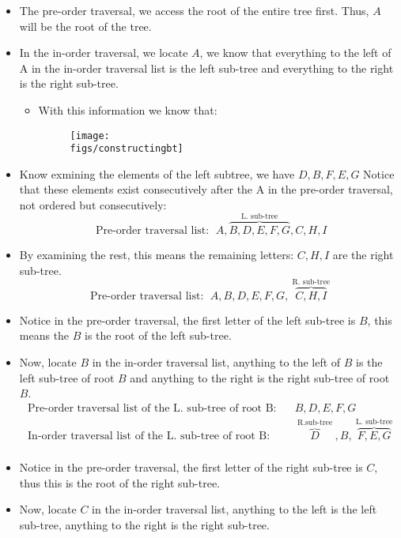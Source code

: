 \begin{itemize}
    \item The pre-order traversal, we access the root of the entire tree first. Thus, $A$ will be the root of the tree.
    \item In the in-order traversal, we locate $A$, we know that everything to the left of A in the in-order traversal list is the left sub-tree and everything to the right is the right sub-tree.
        \begin{itemize}
            \item With this information we know that: 
            \begin{figure}[H]
                \centering
                \texttt{[image: \\figs/constructingbt]}
            \end{figure}
        \end{itemize}

    \item Know exmining the elements of the left subtree, we have $D,B,F,E,G$ Notice that these elements exist consecutively after the A in the pre-order traversal, not ordered but consecutively:
        \[
            \text{ Pre-order traversal list: }\; A,\overbrace{B,D,E,F,G}^{\text{ L. sub-tree }},C,H,I 
        \]
    
    \item By examining the rest, this means the remaining letters: $C,H,I$ are the right sub-tree.
        \[
            \text{ Pre-order traversal list: }\; A,B,D,E,F,G,\overbrace{C,H,I}^{\text{ R. sub-tree }} 
        \]
    
    \item Notice in the pre-order traversal, the first letter of the left sub-tree is $B$, this means the $B$ is the root of the left sub-tree.
    \item Now, locate $B$ in the in-order traversal list, anything to the left of $B$ is the left sub-tree of root $B$ and anything to the right is the right sub-tree of root $B$.
        \begin{align*}
            \text{ Pre-order traversal list of the L. sub-tree of root B:}\quad & B,D,E,F,G \\
            \text{ In-order traversal list of the L. sub-tree of root B: }\quad & \overbrace{D}^{\text{ R.sub-tree }},B,\overbrace{F,E,G}^{\text{ L. sub-tree }} \\
        \end{align*}
    
    \item Notice in the pre-order traversal, the first letter of the right sub-tree is $C$, thus this is the root of the right sub-tree.
    \item Now, locate $C$ in the in-order traversal list, anything to the left is the left sub-tree, anything to the right is the right sub-tree.
    

\end{itemize}
